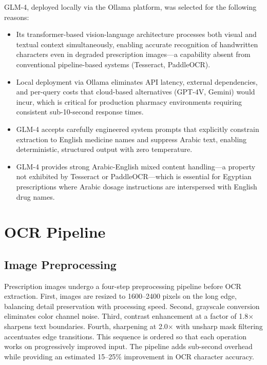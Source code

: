 \documentclass[12pt,a4paper,oneside]{report}
\begin{document}
GLM-4, deployed locally via the Ollama platform, was selected for the following reasons:
\begin{itemize}
\item Its transformer-based vision-language architecture processes both visual and textual context simultaneously, enabling accurate recognition of handwritten characters even in degraded prescription images---a capability absent from conventional pipeline-based systems (Tesseract, PaddleOCR).
\item Local deployment via Ollama eliminates API latency, external dependencies, and per-query costs that cloud-based alternatives (GPT-4V, Gemini) would incur, which is critical for production pharmacy environments requiring consistent sub-10-second response times.
\item GLM-4 accepts carefully engineered system prompts that explicitly constrain extraction to English medicine names and suppress Arabic text, enabling deterministic, structured output with zero temperature.
\item GLM-4 provides strong Arabic-English mixed content handling---a property not exhibited by Tesseract or PaddleOCR---which is essential for Egyptian prescriptions where Arabic dosage instructions are interspersed with English drug names.
\end{itemize}

\section{OCR Pipeline}\label{ocr-pipeline}

\subsection{Image Preprocessing}\label{image-preprocessing}
Prescription images undergo a four-step preprocessing pipeline before OCR extraction. First, images are resized to 1600--2400 pixels on the long edge, balancing detail preservation with processing speed. Second, grayscale conversion eliminates color channel noise. Third, contrast enhancement at a factor of 1.8$\times$ sharpens text boundaries. Fourth, sharpening at 2.0$\times$ with unsharp mask filtering accentuates edge transitions. This sequence is ordered so that each operation works on progressively improved input. The pipeline adds sub-second overhead while providing an estimated 15--25\% improvement in OCR character accuracy.
\end{document}
